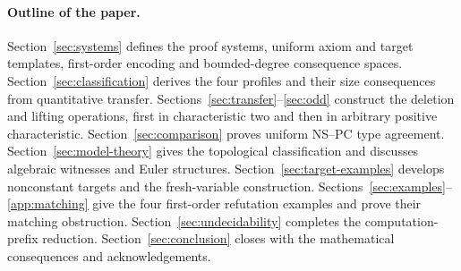 \paragraph{Outline of the paper.}
Section~\ref{sec:systems} defines the proof systems, uniform axiom
and target templates, first-order encoding and bounded-degree
consequence spaces. Section~\ref{sec:classification} derives the
four profiles and their size consequences from quantitative transfer.
Sections~\ref{sec:transfer}--\ref{sec:odd} construct the deletion and
lifting operations, first in characteristic two and then in arbitrary
positive characteristic. Section~\ref{sec:comparison} proves uniform
NS--PC type agreement. Section~\ref{sec:model-theory} gives the topological
classification and discusses algebraic witnesses and Euler structures.
Section~\ref{sec:target-examples} develops nonconstant targets and the
fresh-variable construction. Sections~\ref{sec:examples}--\ref{app:matching}
give the four first-order refutation examples and prove their matching
obstruction.
Section~\ref{sec:undecidability} completes the computation-prefix
reduction. Section~\ref{sec:conclusion} closes with the mathematical
consequences and acknowledgements.

